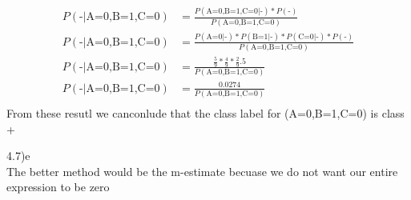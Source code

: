 \documentclass[12pt,english]{article}
\begin{document}
\begin{equation}
\begin{split}
P(\mbox{-} \vert \mbox{A=0,B=1,C=0}) &= \frac{P(\mbox{A=0,B=1,C=0} \vert \mbox{-}) * P(\mbox{-})}{P(\mbox{A=0,B=1,C=0})}\\
P(\mbox{-} \vert \mbox{A=0,B=1,C=0}) &= \frac{P(\mbox{A=0} \vert \mbox{-}) * P(\mbox{B=1} \vert \mbox{-}) *P(\mbox{C=0} \vert \mbox{-}) * P(\mbox{-})}{P(\mbox{A=0,B=1,C=0})}\\
P(\mbox{-} \vert \mbox{A=0,B=1,C=0}) &= \frac{\frac{5}{9} * \frac{4}{9} *\frac{2}{9} .5}{P(\mbox{A=0,B=1,C=0})}\\
P(\mbox{-} \vert \mbox{A=0,B=1,C=0}) &= \frac{0.0274}{P(\mbox{A=0,B=1,C=0})}\\
\end{split}
\end{equation}
From these resutl we canconlude that the class label for (A=0,B=1,C=0) is class +\\
\par
4.7)e\\
The better method would be the m-estimate becuase we do not want our entire expression to be zero
\end{document}
